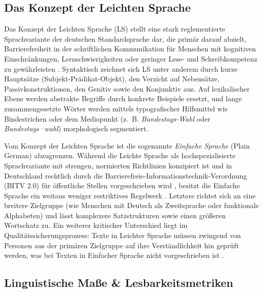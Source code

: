 \label{sec:theoretischer_hintergrund}

\subsection{Das Konzept der Leichten Sprache}
\label{sec:konzept_leichte_sprache}

Das Konzept der Leichten Sprache (LS) stellt eine stark reglementierte Sprachvariante der deutschen Standardsprache dar, die primär darauf abzielt, Barrierefreiheit in der schriftlichen Kommunikation für Menschen mit kognitiven Einschränkungen, Lernschwierigkeiten oder geringer Lese- und Schreibkompetenz zu gewährleisten \citep{bmas2025ratgeber}. Syntaktisch zeichnet sich LS unter anderem durch kurze Hauptsätze (Subjekt-Prädikat-Objekt), den Verzicht auf Nebensätze, Passivkonstruktionen, den Genitiv sowie den Konjunktiv aus. Auf lexikalischer Ebene werden abstrakte Begriffe durch konkrete Beispiele ersetzt, und lange zusammengesetzte Wörter werden mittels typografischer Hilfsmittel wie Bindestrichen oder dem Mediopunkt (z.~B. \textit{Bundestags-Wahl} oder \textit{Bundestags·wahl}) morphologisch segmentiert.

Vom Konzept der Leichten Sprache ist die sogenannte \textit{Einfache Sprache} (Plain German) abzugrenzen. Während die Leichte Sprache als hochspezialisierte Sprachvariante mit strengen, normierten Richtlinien konzipiert ist und in Deutschland rechtlich durch die Barrierefreie-Informationstechnik-Verordnung (BITV 2.0) für öffentliche Stellen vorgeschrieben wird \citep{bitv2019}, besitzt die Einfache Sprache ein weitaus weniger restriktives Regelwerk \citep{bund2026barrierefreiheit}. Letztere richtet sich an eine breitere Zielgruppe (wie Menschen mit Deutsch als Zweitsprache oder funktionale Alphabeten) und lässt komplexere Satzstrukturen sowie einen größeren Wortschatz zu. Ein weiterer kritischer Unterschied liegt im Qualitätssicherungsprozess: Texte in Leichter Sprache müssen zwingend von Personen aus der primären Zielgruppe auf ihre Verständlichkeit hin geprüft werden, was bei Texten in Einfacher Sprache nicht vorgeschrieben ist \citep{bund2026barrierefreiheit}.

\subsection{Linguistische Maße \& Lesbarkeitsmetriken}
\label{sec:linguistische_masse_lesbarkeit}

